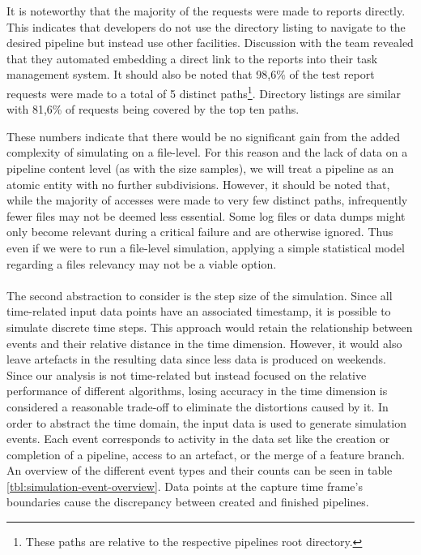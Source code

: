     It is noteworthy that the majority of the requests were made to reports directly. This indicates that developers do not use the directory listing to navigate to the desired pipeline but instead use other facilities. Discussion with the team revealed that they automated embedding a direct link to the reports into their task management system. It should also be noted that 98,6\% of the test report requests were made to a total of 5 distinct paths\footnote{These paths are relative to the respective pipelines root directory.}. Directory listings are similar with 81,6\% of requests being covered by the top ten paths.
    
    These numbers indicate that there would be no significant gain from the added complexity of simulating on a file-level. For this reason and the lack of data on a pipeline content level (as with the size samples), we will treat a pipeline as an atomic entity with no further subdivisions. However, it should be noted that, while the majority of accesses were made to very few distinct paths, infrequently fewer files may not be deemed less essential. Some log files or data dumps might only become relevant during a critical failure and are otherwise ignored. Thus even if we were to run a file-level simulation, applying a simple statistical model regarding a files relevancy may not be a viable option.\\
    \\
    The second abstraction to consider is the step size of the simulation. Since all time-related input data points have an associated timestamp, it is possible to simulate discrete time steps. This approach would retain the relationship between events and their relative distance in the time dimension. However, it would also leave artefacts in the resulting data since less data is produced on weekends. Since our analysis is not time-related but instead focused on the relative performance of different algorithms, losing accuracy in the time dimension is considered a reasonable trade-off to eliminate the distortions caused by it. In order to abstract the time domain, the input data is used to generate simulation events. Each event corresponds to activity in the data set like the creation or completion of a pipeline, access to an artefact, or the merge of a feature branch. An overview of the different event types and their counts can be seen in table \ref{tbl:simulation-event-overview}. Data points at the capture time frame's boundaries cause the discrepancy between created and finished pipelines.

